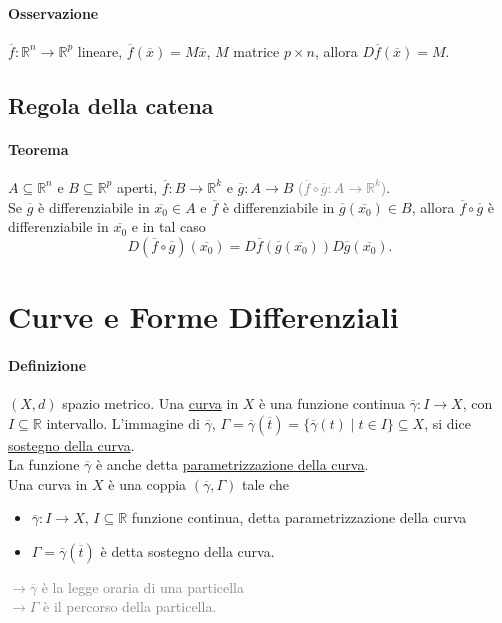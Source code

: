 \documentclass{article}
\newcommand{\R}{\mathbb{R}}
\begin{document}
\paragraph{Osservazione}
$\overline{f}:\R^n \rightarrow \R^p$ lineare, $\overline{f}(\overline{x})=M \overline{x}$, $M$ matrice $p \times n$, allora $D \overline{f}(\overline{x})=M$.

\subsection{{Regola della catena}}
\paragraph{{Teorema}}
$A \subseteq \R^n$ e $B \subseteq \R^p$ aperti, $\overline{f}: B \rightarrow \R^k$ e $\overline{g}:A \rightarrow B$
\textcolor{grey}{($\overline{f}\circ \overline{g}: A \rightarrow \R^k$)}.\\
Se $\overline{g}$ è differenziabile in $\overline{x_0}\in A$ e $\overline{f}$ è differenziabile in $\overline{g}(\overline{x_0})\in B$, allora $\overline{f}\circ \overline{g}$ è differenziabile in $\overline{x_0}$ e in tal caso
\begin{equation*}
    D(\overline{f}\circ \overline{g})(\overline{x_0})=D\overline{f}(\overline{g}(\overline{x_0}))D\overline{g}(\overline{x_0}).
\end{equation*}

\section{\Large\textbf{Curve e Forme Differenziali}}
\paragraph{Definizione}
$(X,d)$ spazio metrico. Una \underline{curva} in $X$ è una funzione continua $\overline{\gamma}:I \rightarrow X$, con $I \subseteq \R$ intervallo. L'immagine di $\overline{\gamma}$, $\Gamma=\overline{\gamma}(\overline{t})=\{\overline{\gamma}(t)\mid t \in I \}\subseteq X$, si dice \underline{sostegno della curva}.\\
La funzione $\overline{\gamma}$ è anche detta \underline{parametrizzazione della curva}.\\
Una curva in $X$ è una coppia $(\overline{\gamma},\Gamma)$ tale che
\begin{itemize}
    \item $\overline{\gamma}:I\rightarrow X$, $I \subseteq \R$ funzione continua, detta parametrizzazione della curva
    \item $\Gamma=\overline{\gamma}(\overline{t})$ è detta sostegno della curva.
\end{itemize}
\textcolor{grey}{$\rightarrow \overline{\gamma}$ è la legge oraria di una particella\\
$\rightarrow \Gamma$ è il percorso della particella.}
\end{document}
